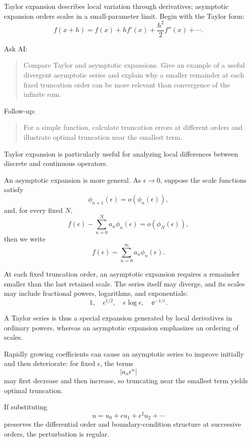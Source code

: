 Taylor expansion describes local variation through derivatives; asymptotic expansion orders scales in a small-parameter limit. Begin with the Taylor form:
\[
f(x+h)
=
f(x)+hf'(x)+\frac{h^2}{2}f''(x)+\cdots.
\]

\begin{askai}
Ask AI:
\begin{quote}
Compare Taylor and asymptotic expansions. Give an example of a useful divergent asymptotic series and explain why a smaller remainder at each fixed truncation order can be more relevant than convergence of the infinite sum.
\end{quote}

Follow-up:
\begin{quote}
For a simple function, calculate truncation errors at different orders and illustrate optimal truncation near the smallest term.
\end{quote}
\end{askai}

Taylor expansion is particularly useful for analyzing local differences between discrete and continuous operators.

An asymptotic expansion is more general. As \(\epsilon\to0\), suppose the scale functions satisfy
\[
\phi_{n+1}(\epsilon)=o(\phi_n(\epsilon)),
\]
and, for every fixed \(N\),
\[
f(\epsilon)
-
\sum_{n=0}^{N}a_n\phi_n(\epsilon)
=
o(\phi_N(\epsilon)),
\]
then we write
\[
f(\epsilon)\sim\sum_{n=0}^{\infty}a_n\phi_n(\epsilon).
\]

At each fixed truncation order, an asymptotic expansion requires a remainder smaller than the last retained scale. The series itself may diverge, and its scales may include fractional powers, logarithms, and exponentials:
\[
1,\quad
\epsilon^{1/2},\quad
\epsilon\log\epsilon,\quad
\ee^{-1/\epsilon}.
\]

A Taylor series is thus a special expansion generated by local derivatives in ordinary powers, whereas an asymptotic expansion emphasizes an ordering of scales.

Rapidly growing coefficients can cause an asymptotic series to improve initially and then deteriorate: for fixed \(\epsilon\), the terms
\[
|a_n\epsilon^n|
\]
may first decrease and then increase, so truncating near the smallest term yields optimal truncation.

If substituting
\[
u=u_0+\epsilon u_1+\epsilon^2u_2+\cdots
\]
preserves the differential order and boundary-condition structure at successive orders, the perturbation is regular.

